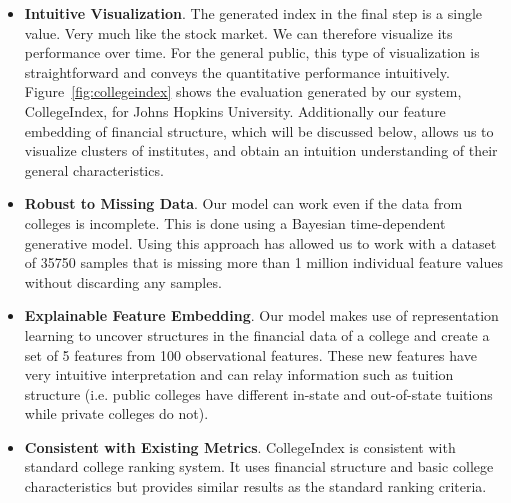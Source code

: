 \documentclass[11pt,letter]{article}
\begin{document}
\begin{itemize}
\item
{\bf Intuitive Visualization}. The generated index in the final step is a single value. Very much like the stock market. We can therefore visualize its performance over time. For the general public, this type of visualization is straightforward and conveys the quantitative performance intuitively. Figure~\ref{fig:collegeindex} shows the evaluation generated by our system, CollegeIndex, for Johns Hopkins University. Additionally our feature embedding of financial structure, which will be discussed below, allows us to visualize clusters of institutes, and obtain an intuition understanding of their general characteristics. 

\item {\bf Robust to Missing Data}. 
Our model can work even if the data from colleges is incomplete. This is done using a Bayesian time-dependent generative model. Using this approach has allowed us to work with a dataset of 35750 samples that is missing more than 1 million individual feature values without discarding any samples. 

\item{\bf Explainable Feature Embedding}. 
Our model makes use of representation learning to uncover structures in the financial data of a college and create a set of 5 features from 100 observational features. These new features have very intuitive interpretation and can relay information such as tuition structure (i.e. public colleges have different in-state and out-of-state tuitions while private colleges do not).

\item {\bf Consistent with Existing Metrics}. CollegeIndex is consistent with standard college ranking system. It uses financial structure and basic college characteristics but provides similar results as the standard ranking criteria.  


\end{itemize}
\end{document}
